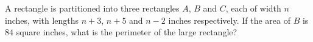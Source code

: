 A rectangle is partitioned into three rectangles $A$, $B$ and $C$, each of width $n$ inches, with lengths $n+3$, $n+5$ and $n-2$ inches respectively. If the area of $B$ is $84$ square inches, what is the perimeter of the large rectangle?
